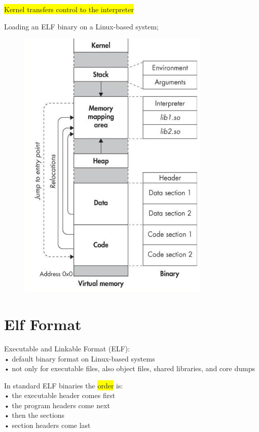 \documentclass[]{project_plan}
\begin{document}
\colorbox{yellow}{Kernel transfers control to the interpreter}

Loading an ELF binary on a Linux-based system;
\begin{figure}[H]
  \centering
  \includegraphics[width=.4\linewidth]{loading_elf.png}
\end{figure}

\section{Elf Format}

Executable and Linkable Format (ELF):\\
• default binary format on Linux-based systems\\
• not only for executable files, also object files, shared libraries, and core dumps

In standard ELF binaries the \colorbox{yellow}{order} is:\\
• the executable header comes first\\
• the program headers come next\\
• then the sections\\
• section headers come last
\end{document}
